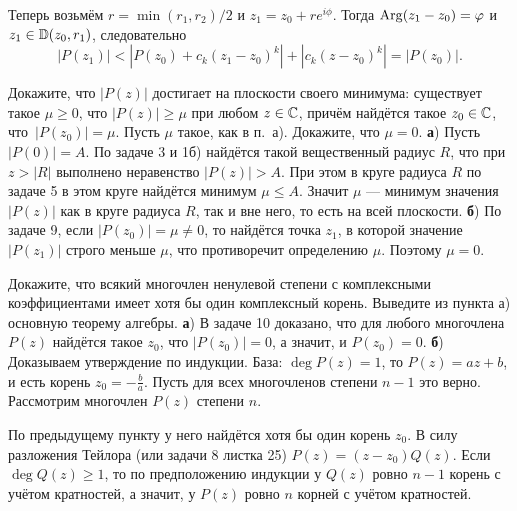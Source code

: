 \documentclass[a4paper, 12pt]{article}
\begin{document}
Теперь возьмём $r=\min(r_1, r_2)/2$ и $z_1 = z_0 + r e^{i\phi}$.
Тогда $\operatorname{Arg}(z_1-z_0) = \varphi$ и $z_1 \in {\Bbb D}(z_0, r_1)$, следовательно
$$
|P(z_1)|<|P(z_0)+c_k(z_1-z_0)^k|+|c_k(z-z_0)^k| = |P(z_0)|.
$$











Докажите, что  $|P(z)|$ достигает на плоскости своего минимума: существует такое
$\mu\ge0$, что $|P(z)|\ge\mu$ при любом $z\in\mathbb{C}$, причём
найдётся такое $z_0\in\mathbb{C}$, что~$|P(z_0)|=\mu$.
 Пусть $\mu$ такое, как в п.~а). Докажите, что  $\mu=0$.
\textbf{а}) Пусть $|P(0)|=A$. По задаче 3 и 1б) найдётся такой вещественный радиус $R$, что при $z > |R|$ выполнено неравенство $|P(z)| > A$. При этом в круге радиуса $R$ по задаче 5 в этом круге найдётся минимум $\mu \leq A$. Значит $\mu$ --- минимум значения $|P(z)|$ как в круге радиуса $R$, так и вне него, то есть на всей плоскости.
\textbf{б}) По задаче 9, если $|P(z_0)|=\mu \neq 0$, то найдётся точка $z_1$, в которой значение $|P(z_1)|$ строго меньше $\mu$, что противоречит определению $\mu$. Поэтому $\mu =0$.












  Докажите, что  всякий %
многочлен ненулевой степени с комплексными коэффициентами
имеет хотя бы один комплексный корень.  Выведите из пункта а) основную теорему
алгебры.
\textbf{а}) В задаче 10 доказано, что для любого многочлена $P(z)$ найдётся такое $z_0$, что $|P(z_0)|=0$, а значит, и $P(z_0)=0$.
\textbf{б}) Доказываем утверждение по индукции. База: $\deg P(z)=1$, то $P(z)=az+b$, и есть корень $z_0= -\frac{b}{a}$. Пусть для всех многочленов степени $n-1$ это верно. Рассмотрим многочлен $P(z)$ степени $n$.

По предыдущему пункту у него найдётся хотя бы один корень $z_0$. В силу разложения Тейлора (или задачи 8 листка 25) $P(z)=(z-z_0)Q(z)$.  Если $\deg Q(z) \geq 1$, то по предположению индукции у $Q(z)$ ровно $n-1$ корень с учётом кратностей, а значит, у $P(z)$ ровно $n$ корней с учётом кратностей.
\end{document}
